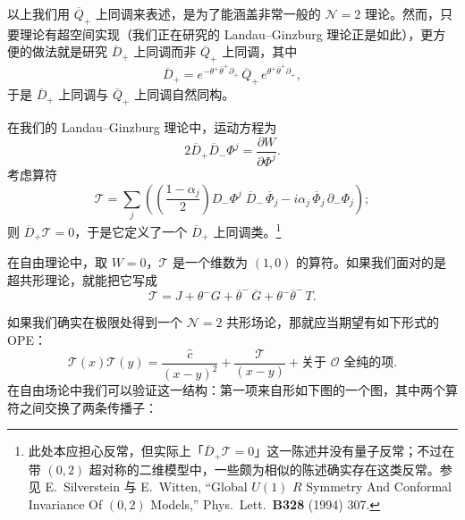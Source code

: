 以上我们用 $\overline{Q}_+$ 上同调来表述，是为了能涵盖非常一般的 $\mathcal{N}=2$ 理论。然而，只要理论有超空间实现（我们正在研究的 Landau--Ginzburg 理论正是如此），更方便的做法就是研究 $\overline{D}_+$ 上同调而非 $\overline{Q}_+$ 上同调，其中
\[
  \overline{D}_+=e^{-\theta^+\overline{\theta}^+\partial_+}\,
  \overline{Q}_+\,e^{\theta^+\overline{\theta}^+\partial_+},
\]
于是 $\overline{D}_+$ 上同调与 $\overline{Q}_+$ 上同调自然同构。

在我们的 Landau--Ginzburg 理论中，运动方程为
\[
  2\overline{D}_+\overline{D}_-\Phi^j=\frac{\partial W}{\partial\Phi^j}.
\]
考虑算符
\[
  \mathcal{T}=\sum_j\left(
  \left(\frac{1-\alpha_j}{2}\right)D_-\Phi^j\;\overline{D}_-\,\overline{\Phi}_j
  -i\alpha_j\,\overline{\Phi}_j\,\partial_-\Phi_j
  \right);
\]
则 $\overline{D}_+\mathcal{T}=0$，于是它定义了一个 $\overline{D}_+$ 上同调类。\footnote{此处本应担心反常，但实际上「$\overline{D}_+\mathcal{T}=0$」这一陈述并没有量子反常；不过在带 $(0,2)$ 超对称的二维模型中，一些颇为相似的陈述确实存在这类反常。参见 E.~Silverstein 与 E.~Witten, ``Global $U(1)$ $R$ Symmetry And Conformal Invariance Of $(0,2)$ Models,'' Phys.\ Lett.\ \textbf{B328} (1994) 307.}


在自由理论中，取 $W=0$，$\mathcal{T}$ 是一个维数为 $(1,0)$ 的算符。如果我们面对的是超共形理论，就能把它写成
\[
  \mathcal{T}=J+\theta^-G+\overline{\theta}^-\,\overline{G}
  +\theta^-\overline{\theta}^-\,T .
\]


如果我们确实在极限处得到一个 $\mathcal{N}=2$ 共形场论，那就应当期望有如下形式的 OPE：
\[
  \mathcal{T}(x)\mathcal{T}(y)=\frac{\widehat{c}}{(x-y)^2}
  +\frac{\mathcal{T}}{(x-y)}+\text{关于 }\mathcal{O}\text{ 全纯的项}.
\]
在自由场论中我们可以验证这一结构：第一项来自形如下图的一个图，其中两个算符之间交换了两条传播子：

